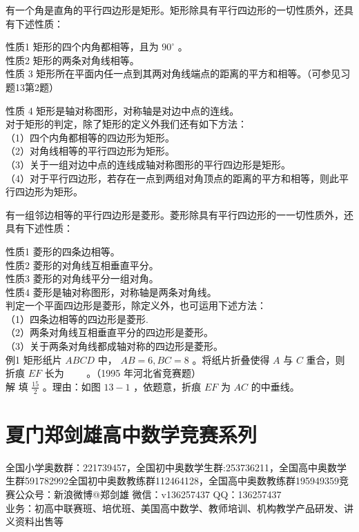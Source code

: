 \documentclass[10pt]{article}
\begin{document}
有一个角是直角的平行四边形是矩形。矩形除具有平行四边形的一切性质外，还具有下述性质：

性质1 矩形的四个内角都相等，且为 $90^{\circ}$ 。\\
性质2 矩形的两条对角线相等。\\
性质 3 矩形所在平面内任一点到其两对角线端点的距离的平方和相等。（可参见习题13第2题）

性质 4 矩形是轴对称图形，对称轴是对边中点的连线。\\
对于矩形的判定，除了矩形的定义外我们还有如下方法：\\
（1）四个内角都相等的四边形为矩形。\\
（2）对角线相等的平行四边形为矩形。\\
（3）关于一组对边中点的连线成轴对称图形的平行四边形是矩形。\\
（4）对于平行四边形，若存在一点到两组对角顶点的距离的平方和相等，则此平行四边形为矩形。

有一组邻边相等的平行四边形是菱形。菱形除具有平行四边形的一一切性质外，还具有下述性质：

性质1 菱形的四条边相等。\\
性质2 菱形的对角线互相垂直平分。\\
性质3 菱形的对角线平分一组对角。\\
性质4 菱形是轴对称图形，对称轴是两条对角线。\\
判定一个平面四边形是菱形，除定义外，也可运用下述方法：\\
（1）四条边相等的四边形是菱形.\\
（2）两条对角线互相垂直平分的四边形是菱形。\\
（3）关于两条对角线都成轴对称的四边形是菱形。\\
例1 矩形纸片 $A B C D$ 中， $A B=6, B C=8$ 。将纸片折叠使得 $A$ 与 $C$ 重合，则折痕 $E F$ 长为 $\qquad$。（1995 年河北省竞赛题）\\
解 填 $\frac{15}{2}$ 。理由：如图 $13-1$ ，依题意，折痕 $E F$ 为 $A C$ 的中垂线。

\section*{夏门郑剑雄高中数学竞赛系列}
全国小学奥数群：221739457，全国初中奥数学生群:253736211，全国高中奥数学生群591782992全国初中奥数教练群112464128，全国高中奥数教练群195949359竞赛公众号：新浪微博@郑剑雄 微信：v136257437 QQ：136257437\\
业务：初高中联赛班、培优班、美国高中数学、教师培训、机构教学产品研发、讲义资料出售等
\end{document}
